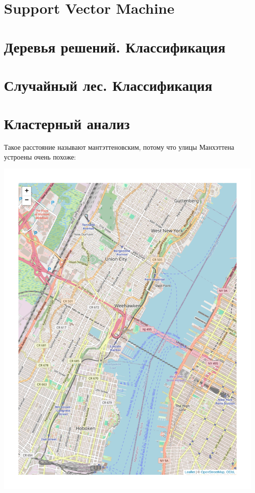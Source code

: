 \documentclass[
  letterpaper,
  DIV=11,
  numbers=noendperiod]{scrreprt}
\theoremstyle{definition}
\theoremstyle{remark}
\begin{document}
\chapter{Support Vector Machine}\label{andan-svm}


\chapter{Деревья решений. Классификация}\label{andan-treesclass}


\chapter{Случайный лес. Классификация}\label{andan-randforestclass}


\chapter{Кластерный анализ}\label{andan-cluster}

Такое расстояние называют мантэттеновским, потому что улицы Манхэттена
устроены очень похоже:

\includegraphics{andan-cluster_files/figure-pdf/manhattan-1.pdf}
\end{document}
